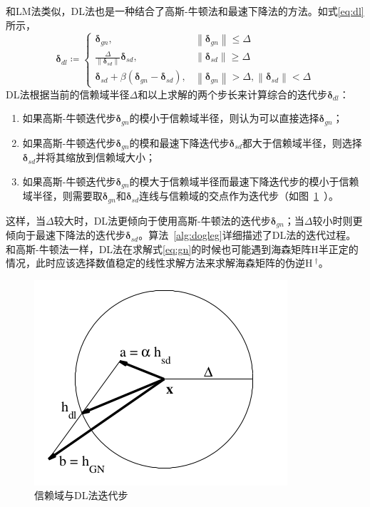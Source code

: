 和LM法类似，DL法也是一种结合了高斯-牛顿法和最速下降法的方法。如式\eqref{eq:dl}所示，
\begin{equation}
    \bm{\delta}_{dl} \coloneqq \left\{
        \begin{array}{lll}
            \bm{\delta}_{gn}, & \left\|\bm{\delta}_{gn}\right\| \leq \Delta \\
            \frac{\Delta}{\left\|\bm{\delta}_{sd}\right\|}\bm{\delta}_{sd}, &
            \left\|\bm{\delta}_{sd}\right\| \geq \Delta \\
            \bm{\delta}_{sd} + \beta(\bm{\delta}_{gn}-\bm{\delta}_{sd}), &
            \left\|\bm{\delta}_{gn}\right\| > \Delta,
            \left\|\bm{\delta}_{sd}\right\| < \Delta
        \end{array}
    \right.
    \label{eq:dl}
\end{equation}
DL法根据当前的信赖域半径$\Delta$和以上求解的两个步长来计算综合的迭代步$\bm{\delta}_{dl}$：
\begin{enumerate}
    \item 如果高斯-牛顿迭代步$\bm{\delta}_{gn}$的模小于信赖域半径，则认为可以直接选择$\bm{\delta}_{gn}$；
    \item 如果高斯-牛顿迭代步$\bm{\delta}_{gn}$的模和最速下降迭代步$\bm{\delta}_{sd}$都大于信赖域半径，则选择$\bm{\delta}_{sd}$并将其缩放到信赖域大小；
    \item 如果高斯-牛顿迭代步$\bm{\delta}_{gn}$的模大于信赖域半径而最速下降迭代步的模小于信赖域半径，则需要取$\bm{\delta}_{gn}$和$\bm{\delta}_{sd}$连线与信赖域的交点作为迭代步（如图~\ref{fig:dogleg_step}~）。
\end{enumerate}
这样，当$\Delta$较大时，DL法更倾向于使用高斯-牛顿法的迭代步$\bm{\delta}_{gn}$；当$\Delta$较小时则更倾向于最速下降法的迭代步$\bm{\delta}_{sd}$。算法~\ref{alg:dogleg}详细描述了DL法的迭代过程。和高斯-牛顿法一样，DL法在求解式\eqref{eq:gn}的时候也可能遇到海森矩阵$\mathrm{H}$半正定的情况，此时应该选择数值稳定的线性求解方法来求解海森矩阵的伪逆$\mathrm{H}~^\dag$。

\begin{figure}[htb!]
    \centering
    \includegraphics[width=.3\textwidth]{Pictures/dogleg_step.png}
    \caption{信赖域与DL法迭代步\citep{tingleff2004methods}}
    \label{fig:dogleg_step}
\end{figure}

